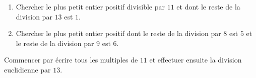 \documentclass[11pt,class=report,crop=false]{standalone}
\begin{document}
    




\bigskip
\bigskip



\exercice{}
\enonce
\sauteligne
 \begin{enumerate}
  \item Chercher le plus petit entier positif divisible par $11$ et dont le reste de la division par $13$ est $1$.
  
  \item Chercher le plus petit entier positif dont le reste de la division par $8$ est $5$ et le reste de la division par $9$ est $6$.
\end{enumerate} 
\finenonce

\indication
Commencer par écrire tous les multiples de $11$ et effectuer ensuite la division euclidienne par $13$.
\finindication
\end{document}
